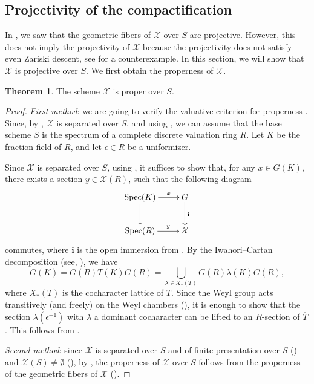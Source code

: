 \documentclass[11pt, reqno]{amsart}
\theoremstyle{plain}
\theoremstyle{definition}
\newtheorem{theorem}{Theorem}[section]
\DeclareMathOperator{\Spec}{Spec}		%
\begin{document}
\subsection{Projectivity of the compactification}
In , we saw that the geometric fibers of $\mathcal{X}$ over $S$ are projective. However, this does not imply the projectivity of $\mathcal{X}$ because the projectivity does not satisfy even Zariski descent, see \cite[Chapter~II, Exercise~7.13]{HartshorneGTM52} for a counterexample. In this section, we will show that $\mathcal{X}$ is projective over $S$.
We first obtain the properness of $\mathcal{X}$.

\begin{theorem}\label{properness}
    The scheme $\mathcal{X}$ is proper over $S$.
\end{theorem}

\begin{proof}
    \emph{First method}: we are going to verify the valuative criterion for properness \cite[théorème~7.3.8]{EGA2}. Since, by , $\mathcal{X}$ is separated over $S$, and using \cite[remarques~7.3.9]{EGA2}, we can assume that the base scheme $S$ is the spectrum of a complete discrete valuation ring $R$. Let $K$ be the fraction field of $R$, and let $\epsilon\in R$ be a uniformizer.
    
    Since $\mathcal{X}$ is separated over $S$, using \cite[Lemma~4.1.1]{valuationcriopendense}, it suffices to show that, for any $x\in G(K)$, there exists a section $y\in \mathcal{X}(R)$, such that the following diagram
     $$\xymatrix{
\Spec (K) \ar[r]^-{x}\ar[d] & G\ar[d]^{\mathbf{i}}\\
\Spec (R) \ar[r]^-{y} & \mathcal{X}
}$$ 
commutes, where $\mathbf{i}$ is the open immersion from . By the Iwahori--Cartan decomposition (see, \cite[Remark~3.5, Theorem~4.1]{Iwahoricdecomp}), we have 
$$G(K)=G(R)T(K)G(R)=\bigcup_{\lambda\in X_{\ast}(T)}G(R)\lambda(K)G(R),$$
where $X_{\ast}(T)$ is the cocharacter lattice of $T$. Since the Weyl group acts transitively (and freely) on the Weyl chambers (\cite[exposé~XXI, corollaire~5.5]{SGA3III}), it is enough to show that the section $\lambda(\epsilon^{-1})$ with $\lambda$ a dominant cocharacter can be lifted to an $R$-section of $\overline{T}$. This follows from .

\emph{Second method}: since $\mathcal{X}$ is separated over $S$ and of finite presentation over $S$ () and $\mathcal{X}(S)\neq \emptyset$ (), by \cite[corollaire~15.7.11]{EGAIV3}, the properness of $\mathcal{X}$ over $S$ follows from the properness of the geometric fibers of $\mathcal{X}$ ().
\end{proof}
\end{document}
